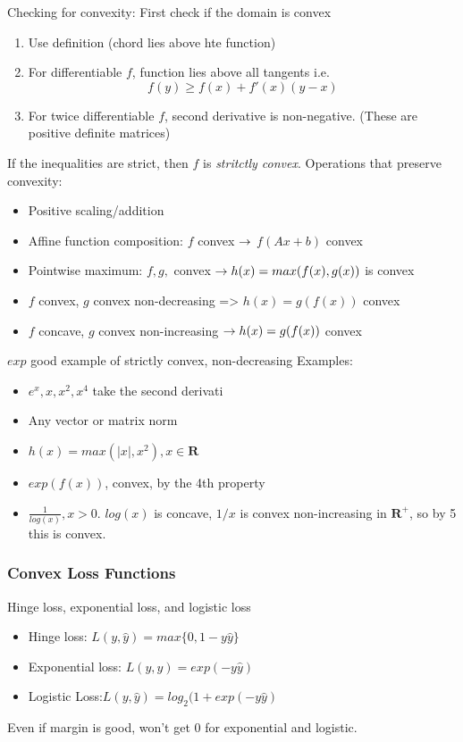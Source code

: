 Checking for convexity: First check if the domain is convex
\begin{enumerate}
\item Use definition (chord lies above hte function)
\item For differentiable $f$, function lies above all tangents i.e.
$$f(y) \ge f(x) + f'(x)(y-x)$$
\item For twice differentiable $f$, second derivative is
  non-negative. (These are positive definite matrices)
\end{enumerate}
If the inequalities are strict, then $f$ is \emph{stritctly convex}.
Operations that preserve convexity:
\begin{itemize}
\item Positive scaling/addition
\item Affine function composition: $f$ convex $\rightarrow$ $f(Ax+b)$ convex
\item Pointwise maximum: $f,g,$ convex $\rightarrow h(x) = max(f(x),g(x))$
  is convex
\item $f$ convex, $g$ convex non-decreasing => $h(x)=g(f(x))$ convex
\item $f$ concave, $g$ convex non-increasing $\rightarrow h(x) =g(f(x))$ convex

\end{itemize}
$exp$ good example of strictly convex, non-decreasing
Examples:
\begin{itemize}
\item $e^x,x,x^2,x^4$ take the second derivati
\item Any vector or matrix norm
\item $h(x) = max(|x|,x^2), x\in \mathbf{R}$
\item $exp(f(x))$, convex, by the 4th property
\item $\frac{1}{log(x)}, x>0$. $log(x)$ is concave, $1/x$
  is convex non-increasing in $\mathbf{R^+}$, so by 5 this is convex.
\end{itemize}

\subsubsection{Convex Loss Functions}
\label{sec:convexlossfunctions}

Hinge loss, exponential loss, and logistic loss
\begin{itemize}
\item Hinge loss: $L(y,\hat y) = max\{0, 1-y\hat y\}$
\item Exponential loss: $L(y,\hat y) = exp(-y\hat y)$ 
\item Logistic Loss:$L(y,\hat y) = log_2(1+exp(-y\hat y)$ 
\end{itemize}
Even if margin  is good, won't get 0 for exponential and logistic.

